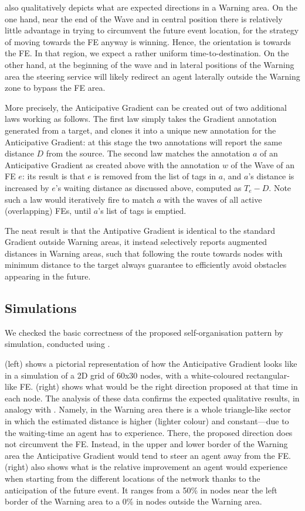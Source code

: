 \documentclass[12pt,a4paper,twoside,openright]{book}
\begin{document}
 also qualitatively depicts what are expected directions in a Warning area.
%
On the one hand, near the end of the Wave and in central position there is relatively little advantage in trying to circumvent the future event location, for the strategy of moving towards the FE anyway is winning. Hence, the orientation is towards the FE. In that region, we expect a rather uniform time-to-destination.
%
On the other hand, at the beginning of the wave and in lateral positions of the Warning area the steering service will likely redirect an agent laterally outside the Warning zone to bypass the FE area.

More precisely, the Anticipative Gradient can be created out of two additional laws working as follows.
%
The first law simply takes the Gradient annotation generated from a target, and clones it into a unique new annotation for the Anticipative Gradient: at this stage the two annotations will report the same distance $D$ from the source.
%
The second law matches the annotation $a$ of an Anticipative Gradient as created above with the annotation $w$ of the Wave of an FE $e$: its result is that $e$ is removed from the list of tags in $a$, and $a$'s distance is increased by $e$'s waiting distance as discussed above, computed as $T_e-D$. 
%
Note such a law would iteratively fire to match $a$ with the waves of all active (overlapping) FEs, until $a$'s list of tags is emptied.

The neat result is that the Antipative Gradient is identical to the standard Gradient outside Warning areas, it instead selectively reports augmented distances in Warning areas, such that following the route towards nodes with minimum distance to the target always guarantee to efficiently avoid obstacles appearing in the future.


\subsection{Simulations}

We checked the basic correctness of the proposed self-organisation pattern by simulation, conducted using \alchemist{}.

 (left) shows a pictorial representation of how the Anticipative Gradient looks like in a simulation of a 2D grid of 60x30 nodes, with a white-coloured rectangular-like FE.  (right) shows what would be the right direction proposed at that time in each node. The analysis of these data confirms the expected qualitative results, in analogy with . Namely, in the Warning area there is a whole triangle-like sector in which the estimated distance is higher (lighter colour) and constant---due to the waiting-time an agent has to experience. There, the proposed direction does not circumvent the FE. Instead, in the upper and lower border of the Warning area the Anticipative Gradient would tend to steer an agent away from the FE.
%
 (right) also shows what is the relative improvement an agent would experience when starting from the different locations of the network thanks to the anticipation of the future event. It ranges from a 50\% in nodes near the left border of the Warning area to a 0\% in nodes outside the Warning area.
\end{document}
